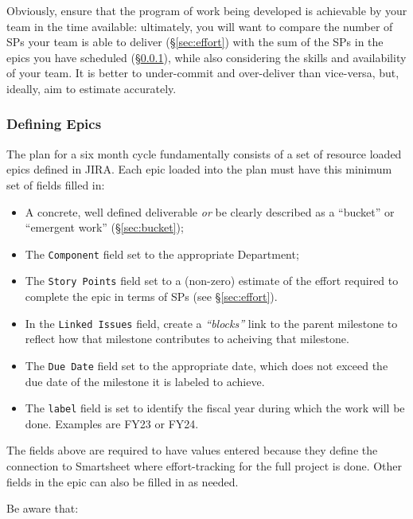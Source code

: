 Obviously, ensure that the program of work being developed is achievable by your team in the time available: ultimately, you will want to compare the number of \glspl{SP} your team is able to deliver (\S\ref{sec:effort}) with the sum of the \glspl{SP} in the \glspl{epic} you have scheduled (\S\ref{sec:planning-epics}), while also considering the skills and availability of your team.
It is better to under-commit and over-deliver than vice-versa, but, ideally, aim to estimate accurately.

\subsubsection{Defining Epics} \label{sec:planning-epics}

The plan for a six month \gls{cycle} fundamentally consists of a set of resource loaded \glspl{epic} defined in \gls{JIRA}.
Each \gls{epic} loaded into the plan must have this minimum set of fields filled in:

\begin{itemize}
\item A concrete, well defined deliverable \emph{or} be clearly described as a ``bucket'' or ``emergent work'' (\S\ref{sec:bucket});
\item The \texttt{Component} field set to the appropriate Department;
\item The \texttt{Story Points} field set to a (non-zero) estimate of the effort required to complete the \gls{epic} in terms of \glspl{SP} (see \S\ref{sec:effort}).
\item In the \texttt{Linked Issues} field, create a \textit{``blocks''} link to the parent milestone to reflect how that milestone contributes to acheiving that milestone.
\item The \texttt{Due Date} field set to the appropriate date, which does not exceed the due date of the milestone it is labeled to achieve.
\item The \texttt{label} field is set to identify the fiscal year during which the work will be done. Examples are \gls{FY23} or \gls{FY24}.

\end{itemize}
The fields above are required to have values entered because they define the connection to Smartsheet where effort-tracking for the full project is done. Other fields in the \gls{epic} can also be filled in as needed.

Be aware that:

